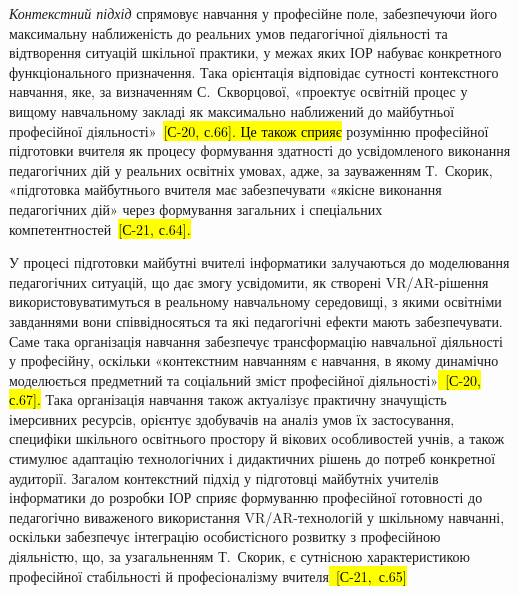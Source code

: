 \emph{Контекстний підхід} спрямовує навчання у професійне поле, забезпечуючи його максимальну наближеність до реальних умов педагогічної діяльності та відтворення ситуацій шкільної практики, у межах яких ІОР набуває конкретного функціонального призначення. Така орієнтація відповідає сутності контекстного навчання, яке, за визначенням С.~Скворцової, «проектує освітній процес у вищому навчальному закладі як максимально наближений до майбутньої професійної діяльності»~\hl{{[}С-20, с.66{]}. Це також сприяє} розумінню професійної підготовки вчителя як процесу формування здатності до усвідомленого виконання педагогічних дій у реальних освітніх умовах, адже, за зауваженням Т.~Скорик, «підготовка майбутнього вчителя має забезпечувати «якісне виконання педагогічних дій» через формування загальних і спеціальних компетентностей~\hl{{[}С-21, с.64{]}.}

У процесі підготовки майбутні вчителі інформатики залучаються до моделювання педагогічних ситуацій, що дає змогу усвідомити, як створені VR/AR-рішення використовуватимуться в реальному навчальному середовищі, з якими освітніми завданнями вони співвідносяться та які педагогічні ефекти мають забезпечувати. Саме така організація навчання забезпечує трансформацію навчальної діяльності у професійну, оскільки «контекстним навчанням є навчання, в якому динамічно моделюється предметний та соціальний зміст професійної діяльності»\hl{~{[}С-20, с.67{]}.} Така організація навчання також актуалізує практичну значущість імерсивних ресурсів, орієнтує здобувачів на аналіз умов їх застосування, специфіки шкільного освітнього простору й вікових особливостей учнів, а також стимулює адаптацію технологічних і дидактичних рішень до потреб конкретної аудиторії. Загалом контекстний підхід у підготовці майбутніх учителів інформатики до розробки ІОР сприяє формуванню професійної готовності до педагогічно виваженого використання VR/AR-технологій у шкільному навчанні, оскільки забезпечує інтеграцію особистісного розвитку з професійною діяльністю, що, за узагальненням Т.~Скорик, є сутнісною характеристикою професійної стабільності й професіоналізму вчителя\hl{~{[}С-21,~с.65{]}}

